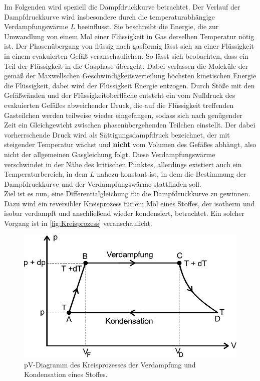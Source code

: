 Im Folgenden wird speziell die Dampfdruckkurve betrachtet.
Der Verlauf der Dampfdruckkurve wird insbesondere durch die temperaturabhängige Verdampfungswärme $L$ beeinflusst.
Sie beschreibt die Energie, die zur Umwandlung von einem Mol einer Flüssigkeit in Gas derselben Temperatur nötig ist.
Der Phasenübergang von flüssig nach gasförmig lässt sich an einer Flüssigkeit in einem evakuierten Gefäß veranschaulichen.
So lässt sich beobachten, dass ein Teil der Flüssigkeit in die Gasphase übergeht.
Dabei verlassen die Moleküle der gemäß der Maxwellschen Geschwindigkeitsverteilung höchsten kinetischen Energie die Flüssigkeit, dabei wird der Flüssigkeit Energie entzogen.
Durch Stöße mit den Gefäßwänden und der Flüssigkeitoberfläche entsteht ein vom Nulldruck des evakuierten Gefäßes abweichender Druck, die auf die Flüssigkeit treffenden Gasteilchen werden teilweise wieder eingefangen, sodass sich nach genügender Zeit ein Gleichgewicht
zwischen phasenübergehenden Teilchen einstellt.
Der dabei vorherrschende Druck wird als Sättigungsdampfdruck bezeichnet, der mit steigender Temperatur wächst und \textbf{nicht} vom Volumen des Gefäßes abhängt, also nicht der allgemeinen Gasgleichung folgt. 
Diese Verdampfungswärme verschwindet in der Nähe des kritischen Punktes, allerdings existiert auch ein Temperaturbereich, in dem $L$ nahezu konstant ist, in dem die Bestimmung der Dampfdruckkurve und der Verdampfungswärme stattfinden soll. \\

Ziel ist es nun, eine Differentialgleichung für die Dampfdruckkurve zu gewinnen.
Dazu wird ein reversibler Kreisprozess für ein Mol eines Stoffes, der isotherm und isobar verdampft und anschließend wieder kondensiert, betrachtet.
Ein solcher Vorgang ist in \autoref{fig:Kreisprozess} veranschaulicht.

\begin{figure}
    \centering
    \includegraphics{Kreisprozess.pdf}
    \caption{pV-Diagramm des Kreisprozesses der Verdampfung und Kondensation eines Stoffes\cite{ap06}.}
    \label{fig:Kreisprozess}
\end{figure}

